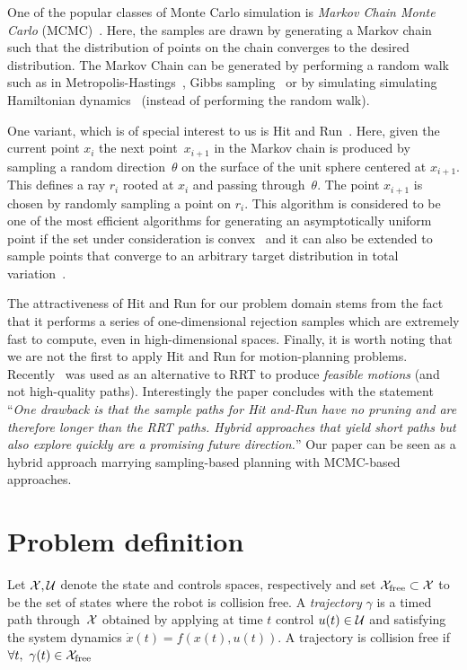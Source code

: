 \documentclass[letterpaper, 10 pt, conference]{ieeeconf}  %
\begin{document}
One of the popular classes of Monte Carlo simulation is 
\emph{Markov Chain Monte Carlo} (MCMC)~\cite{ADDJ03}.
Here, the samples are drawn by generating a Markov chain such that the distribution of points on the chain converges to the desired distribution.
The Markov Chain can be generated by performing a random walk such as
in Metropolis-Hastings~\cite{CG95}, 
Gibbs sampling~\cite{CK94}
or by simulating simulating Hamiltonian dynamics~\cite{N94} (instead of performing the random walk).

One variant, which is of special interest to us is 
Hit and Run~\cite{S84,KSZ11}.
Here, given the current point $x_i$ the next point~$x_{i+1}$ in the Markov chain is produced by sampling a random direction~$\theta$ on the surface of the unit sphere centered at $x_{i+1}$. This defines a ray $r_i$ rooted at $x_i$ and passing through~$\theta$. The point $x_{i+1}$ is chosen by randomly sampling a point on $r_i$.
This algorithm is considered to be one of the most efficient algorithms for generating an asymptotically uniform point if the set under consideration is convex~\cite{L99, LV06}
and it can also be extended to sample points that converge to an arbitrary target distribution in total variation~\cite{BRS93, RS94}.

The attractiveness of Hit and Run for our problem domain stems from the fact that it performs a series of one-dimensional rejection samples which are extremely fast to compute, even in high-dimensional spaces. 
Finally, it is worth noting that we are not the first to apply Hit and Run for motion-planning problems.
Recently~\cite{YPVA17} was used as an alternative to RRT to produce \emph{feasible motions} (and not high-quality paths). 
Interestingly the paper concludes with the statement ``\emph{One drawback is that the sample paths for Hit and-Run have no pruning and are therefore longer than the RRT paths. Hybrid approaches that yield short paths but also explore quickly are a promising future direction.}''
Our paper can be seen as a hybrid approach marrying sampling-based planning with MCMC-based approaches.

\section{Problem definition}
\label{sec:pdef}


Let $\mathcal{X}, \mathcal{U}$ denote the state and controls spaces, respectively and set $\mathcal{X}_{\rm free} \subset \mathcal{X}$ to be the set of states where the robot is collision free.
A \emph{trajectory} $\gamma$ is a timed path through~$\mathcal{X}$ obtained by applying at time $t$ control $u(t) \in \mathcal{U}$ and satisfying the system dynamics 
$\dot{x}(t) = f( x(t) , u(t) )$.
A trajectory is collision free if $\forall t,~\gamma(t) \in \mathcal{X}_{\rm free}$
\end{document}
